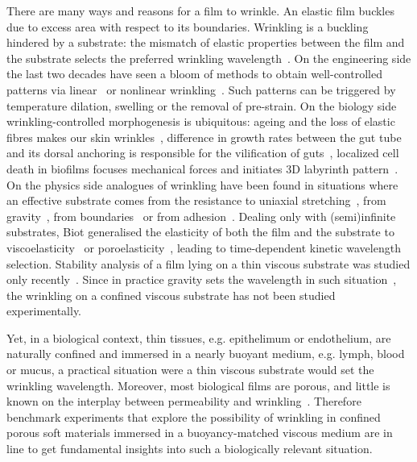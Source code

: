 \documentclass[twocolumn,superscriptaddress,showpacs,preprintnumbers,
amsmath,amssymb,prl]{revtex4-1}
\begin{document}
There are many ways and reasons for a film to wrinkle. An elastic film buckles due to excess area with respect to its boundaries. Wrinkling is a buckling hindered by a substrate: the mismatch of elastic properties between the film and the substrate selects the preferred wrinkling wavelength~\cite{Gough1940, Bijlaard1946}. On the engineering side the last two decades have seen a bloom of methods to obtain well-controlled patterns via linear~\cite{Bowden1998, Genzer2006, Hu1998, Kim2010, Vandeparre2011, Li2013} or nonlinear wrinkling~\cite{Efimenko2005, Guvendiren2010, Kim2011a, Brau2011}. Such patterns can be triggered by temperature dilation, swelling or the removal of pre-strain. On the biology side wrinkling-controlled morphogenesis is ubiquitous: ageing and the loss of elastic fibres makes our skin wrinkles~\cite{Bissett1987, Genzer2006}, difference in growth rates between the gut tube and its dorsal anchoring is responsible for the vilification of guts~\cite{Savin2011, Ciarletta2014, Shyer2013}, localized cell death in biofilms focuses mechanical forces and initiates 3D labyrinth pattern~\cite{Trejo2013, Asally2012}. On the physics side analogues of wrinkling have been found in situations where an effective substrate comes from the resistance to uniaxial stretching~\cite{Cerda2003}, from gravity~\cite{Kolinski2009, Vella2009, Pineirua2013, Lucantonio2013}, from boundaries~\cite{Vandeparre2011a, Li2013} or from adhesion~\cite{Vella2009a}. Dealing only with (semi)infinite substrates, Biot generalised the elasticity of both the film and the substrate to viscoelasticity~\cite{Biot1957} or poroelasticity~\cite{Biot1964}, leading to time-dependent kinetic wavelength selection. Stability analysis of a film lying on a thin viscous substrate was studied only recently~\cite{Huang2002}. Since in practice gravity sets the wavelength in such situation~\cite{Smoluchowski1910}, the wrinkling on a confined viscous substrate has not been studied experimentally.

Yet, in a biological context, thin tissues, e.g. epithelimum or endothelium, are naturally confined and immersed in a nearly buoyant medium, e.g. lymph, blood or mucus, a practical situation were a thin viscous substrate would set the wrinkling wavelength. Moreover, most biological films are porous, and little is known on the interplay between permeability and wrinkling~\cite{Ma2004,Longley2013}. Therefore benchmark experiments that explore the possibility of wrinkling in confined porous soft materials immersed in a buoyancy-matched viscous medium are in line to get fundamental insights into such a biologically relevant situation.
\end{document}
